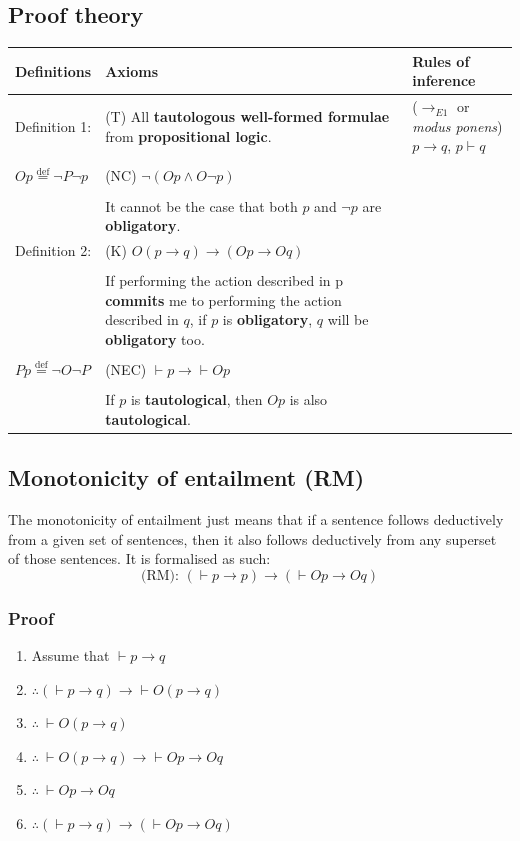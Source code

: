\documentclass[11pt]{article}
\newcommand{\defequal}{\stackrel{\scriptscriptstyle\mathrm{def}}{=}}
\begin{document}
\subsection{Proof theory}
\label{sec:org9bfa5b5}
\begin{center}
\begin{tabularx}{\textwidth}{|X|X|X|}
\hline
Definitions & Axioms & Rules of inference\\
\hline
Definition 1: & (T) All \textbf{tautologous well-formed formulae} from \textbf{propositional logic}. & (\(\rightarrow_{E1}\) or \emph{modus ponens}) \(p \rightarrow q\), \(p \vdash q\)\\
 &  & \\
\(Op \defequal \neg P \neg p\) & (NC) \(\neg (Op \wedge O \neg p)\) & \\
 &  & \\
 & It cannot be the case that both \(p\) and \(\neg p\) are \textbf{obligatory}. & \\
\hline
Definition 2: & (K) \(O(p \rightarrow q) \rightarrow (Op \rightarrow Oq)\) & \\
 &  & \\
 & If performing the action described in p \textbf{commits} me to performing the action described in \(q\), if \(p\) is \textbf{obligatory}, \(q\) will be \textbf{obligatory} too. & \\
 &  & \\
\(Pp \defequal \neg O \neg P\) & (NEC) \(\vdash p \rightarrow \vdash Op\) & \\
 &  & \\
 & If \(p\) is \textbf{tautological}, then \(Op\) is also \textbf{tautological}. & \\
\hline
\end{tabularx}
\end{center}

 \newpage
\subsection{Monotonicity of entailment (RM)}
\label{sec:org6c5b9bc}
The monotonicity of entailment just means that if a sentence follows deductively from a given set of sentences, then it also follows deductively from any superset of those sentences. It is formalised as such:
\[\text{(RM): } (\vdash p \rightarrow p) \rightarrow (\vdash Op \rightarrow Oq)\]
\subsubsection{Proof}
\label{sec:org218a627}
\begin{enumerate}
\item Assume that \(\vdash p \rightarrow q\)
\item \(\therefore (\vdash p \rightarrow q) \rightarrow \vdash O(p \rightarrow q)\)
\item \(\therefore \ \vdash O(p \rightarrow q)\)
\item \(\therefore \ \vdash O(p \rightarrow q) \rightarrow \vdash Op \rightarrow Oq\)
\item \(\therefore \ \vdash Op \rightarrow Oq\)
\item \(\therefore (\vdash p \rightarrow q) \rightarrow (\vdash Op \rightarrow Oq)\)
\end{enumerate}
\end{document}
